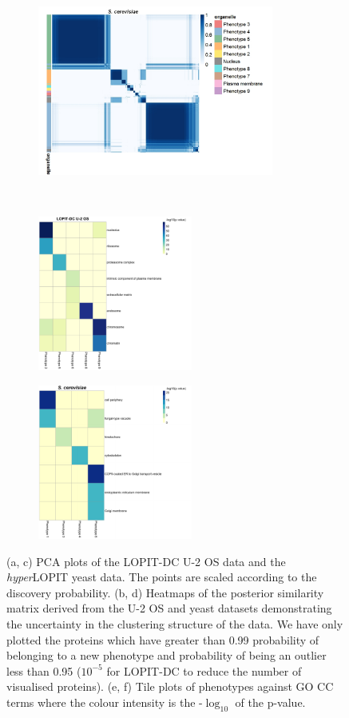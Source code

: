 \documentclass[12pt,english]{article}
\begin{document}
\begin{figure}
\begin{subfigure}[t]{0.5\textwidth}
	\caption{}
\end{subfigure}
\begin{subfigure}[t]{0.5\textwidth}
	\centering
	\includegraphics[height=2.2in]{heatmapYeast.jpeg}
	\caption{}
\end{subfigure}
~
\begin{subfigure}[t]{0.5\textwidth}
	\centering
	\includegraphics[height=2in]{pvaluesDC}
	\caption{}
\end{subfigure}
\begin{subfigure}[t]{0.5\textwidth}
	\centering
	\includegraphics[height=2in]{pvalueYeast}
	\caption{}
\end{subfigure}
\caption{(a, c) PCA plots of the LOPIT-DC U-2 OS data and the \textit{hyper}LOPIT yeast data. The points are scaled according to the discovery probability. (b, d) Heatmaps of the posterior similarity matrix derived from the U-2 OS and yeast datasets demonstrating the uncertainty in the clustering structure of the data. We have only plotted the proteins which have greater than 0.99 probability of belonging to a new phenotype and probability of being an outlier less than 0.95 ($10^{-5}$ for LOPIT-DC to reduce the number of visualised proteins). (e, f) Tile plots of phenotypes against GO CC terms where the colour intensity is the -$\log_{10}$ of the p-value.}
 \label{figure:DC}
\end{figure}
\end{document}
